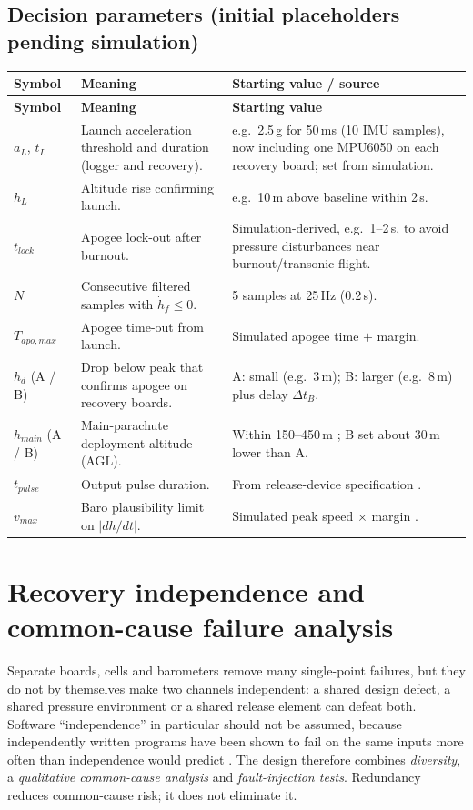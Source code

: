 \subsection{Decision parameters (initial placeholders pending simulation)}
\small
{}
\begin{longtable}{@{}L{22mm}L{58mm}L{66mm}@{}}
\toprule{}\textbf{Symbol}&\textbf{Meaning}&\textbf{Starting value / source}\\\midrule\endfirsthead
\toprule{}\textbf{Symbol}&\textbf{Meaning}&\textbf{Starting value}\\\midrule\endhead
\bottomrule\endlastfoot
$a_L$, $t_L$ & Launch acceleration threshold and duration (logger and recovery). & e.g.\ 2.5\,g for 50\,ms (10 IMU samples), now including one MPU6050 on each recovery board; set from simulation.\\
$h_L$ & Altitude rise confirming launch. & e.g.\ 10\,m above baseline within 2\,s.\\
$t_{lock}$ & Apogee lock-out after burnout. & Simulation-derived, e.g.\ 1--2\,s, to avoid pressure disturbances near burnout/transonic flight.\\
$N$ & Consecutive filtered samples with $\dot h_f\le0$. & 5 samples at 25\,Hz (0.2\,s).\\
$T_{apo,max}$ & Apogee time-out from launch. & Simulated apogee time $+$ margin.\\
$h_d$ (A / B) & Drop below peak that confirms apogee on recovery boards. & A: small (e.g.\ 3\,m); B: larger (e.g.\ 8\,m) plus delay $\Delta t_B$.\\
$h_{main}$ (A / B) & Main-parachute deployment altitude (AGL). & Within 150--450\,m \cite{rtc2027app03,rtc2027app08}; B set about 30\,m lower than A.\\
$t_{pulse}$ & Output pulse duration. & From release-device specification .\\
$v_{max}$ & Baro plausibility limit on $|dh/dt|$. & Simulated peak speed $\times$ margin .\\
\end{longtable}
\normalsize
\label{tab:params}

\section{Recovery independence and common-cause failure analysis}
\label{sec:ccf}
Separate boards, cells and barometers remove many single-point failures, but they do not by themselves make two channels independent: a shared design defect, a shared pressure environment or a shared release element can defeat both. Software ``independence'' in particular should not be assumed, because independently written programs have been shown to fail on the same inputs more often than independence would predict \cite{knight1986}. The design therefore combines \emph{diversity}, a \emph{qualitative common-cause analysis} and \emph{fault-injection tests}. Redundancy reduces common-cause risk; it does not eliminate it.

